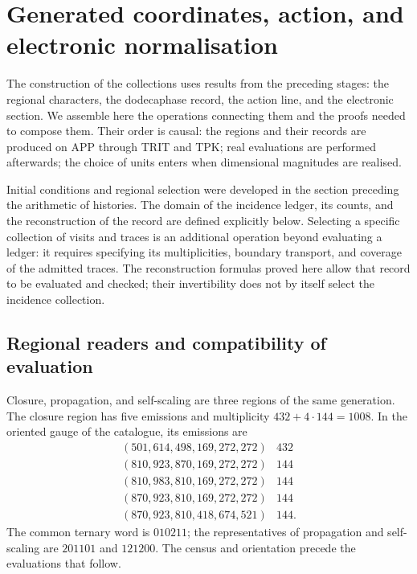 \section{Generated coordinates, action, and electronic normalisation}
\label{vi:dep:seccion}\label{sec:k-registro}

The construction of the collections uses results from the preceding stages:
the regional characters, the dodecaphase record, the action line, and the
electronic section. We assemble here the operations connecting them and the
proofs needed to compose them. Their order is causal: the regions and their
records are produced on APP through TRIT and TPK; real evaluations
are performed afterwards; the choice of units enters when dimensional
magnitudes are realised.

Initial conditions and regional selection were developed in
the section preceding the arithmetic of histories. The domain of the incidence
ledger, its counts, and the reconstruction of the record are defined
explicitly below. Selecting a specific collection of
visits and traces is an additional operation beyond evaluating a ledger:
it requires specifying its multiplicities, boundary transport, and
coverage of the admitted traces. The reconstruction formulas
proved here allow that record to be evaluated and checked; their
invertibility does not by itself select the incidence collection.

\subsection{Regional readers and compatibility of evaluation}
\label{vi:dep:regiones}

Closure, propagation, and self-scaling are three regions of the same
generation. The closure region has five emissions and multiplicity
\(432+4\cdot144=1008\). In the oriented gauge of the catalogue, its emissions
are
\[
\begin{array}{c|r}
(501,614,498,169,272,272)&432\\
(810,923,870,169,272,272)&144\\
(810,983,810,169,272,272)&144\\
(870,923,810,169,272,272)&144\\
(870,923,810,418,674,521)&144.
\end{array}
\]
The common ternary word is \(010211\); the representatives of propagation
and self-scaling are \(201101\) and \(121200\). The census and orientation
precede the evaluations that follow.

